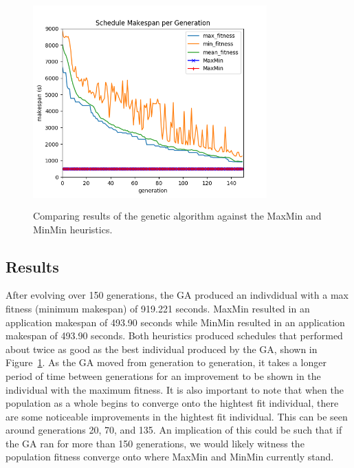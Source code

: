 \begin{figure}[H]
  \centering
  \includegraphics[width=90mm, height=80mm]{figures/results.png}
  \caption{Comparing results of the genetic algorithm against the MaxMin and MinMin heuristics.}
  \label{fig:results}
\end{figure}

\subsection*{Results}
After evolving over 150 generations, the GA produced an indivdidual with a
max fitness (minimum makespan) of 919.221 seconds. MaxMin resulted in an
application makespan of 493.90 seconds while MinMin resulted in an application
makespan of 493.90 seconds. Both heuristics produced schedules that performed
about twice as good as the best individual produced by the GA, shown in
Figure~\ref{fig:results}. As the GA moved from generation to generation, it
takes a longer period of time between generations for an improvement to be
shown in the individual with the maximum fitness. It is also important to note
that when the population as a whole begins to converge onto the hightest fit
individual, there are some noticeable improvements in the hightest fit
individual. This can be seen around generations 20, 70, and 135. An implication
of this could be such that if the GA ran for more than 150 generations, we
would likely witness the population fitness converge onto where MaxMin and MinMin
currently stand.
